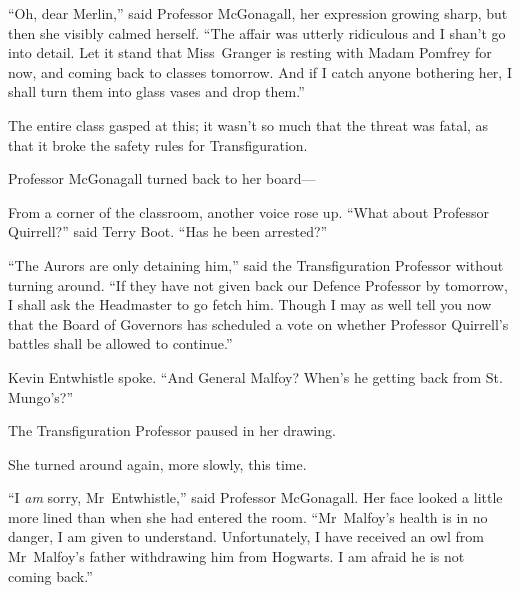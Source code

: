 “Oh, dear Merlin,” said Professor McGonagall, her expression growing sharp, but then she visibly calmed herself.
“The affair was utterly ridiculous and I shan’t go into detail. Let it stand that Miss~Granger is resting with Madam Pomfrey for now, and coming back to classes tomorrow. And if I catch anyone bothering her, I shall turn them into glass vases and drop them.”

The entire class gasped at this; it wasn’t so much that the threat was fatal, as that it broke the safety rules for Transfiguration.

Professor McGonagall turned back to her board—

From a corner of the classroom, another voice rose up.
“What about Professor Quirrell?” said Terry Boot.
“Has he been arrested?”

“The Aurors are only detaining him,” said the Transfiguration Professor without turning around.
“If they have not given back our Defence Professor by tomorrow, I shall ask the Headmaster to go fetch him. Though I may as well tell you now that the Board of Governors has scheduled a vote on whether Professor Quirrell’s battles shall be allowed to continue.”

Kevin Entwhistle spoke.
“And General Malfoy? When’s he getting back from St. Mungo’s?”

The Transfiguration Professor paused in her drawing.

She turned around again, more slowly, this time.

“I \emph{am} sorry, Mr~Entwhistle,” said Professor McGonagall. Her face looked a little more lined than when she had entered the room.
“Mr~Malfoy’s health is in no danger, I am given to understand. Unfortunately, I have received an owl from Mr~Malfoy’s father withdrawing him from Hogwarts. I am afraid he is not coming back.”
